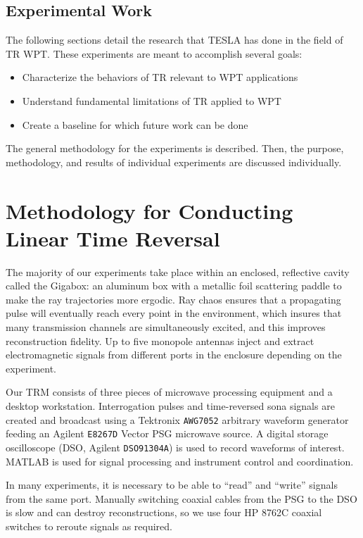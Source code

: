 \section{Experimental Work}
The following sections detail the research that TESLA has done in the field of TR WPT.  These experiments are meant to accomplish several goals:

\begin{itemize}
    \item Characterize the behaviors of TR relevant to WPT applications
    \item Understand fundamental limitations of TR applied to WPT
    \item Create a baseline for which future work can be done
\end{itemize}

The general methodology for the experiments is described. Then, the purpose, methodology, and results of individual experiments are discussed individually.

\chapter{Methodology for Conducting Linear Time Reversal}
\label{ch:linear-meth}

The majority of our experiments take place within an enclosed, reflective cavity called the Gigabox: an aluminum box with a metallic foil scattering paddle to make the ray trajectories more ergodic. Ray chaos ensures that a propagating pulse will eventually reach every point in the environment, which insures that many transmission channels are simultaneously excited, and this improves reconstruction fidelity. Up to five monopole antennas inject and extract electromagnetic signals from different ports in the enclosure depending on the experiment.

Our TRM consists of three pieces of microwave processing equipment and a desktop workstation. Interrogation pulses and time-reversed sona signals are created and broadcast using a Tektronix \texttt{AWG7052} arbitrary waveform generator feeding an Agilent \texttt{E8267D} Vector PSG microwave source. A digital storage oscilloscope (DSO, Agilent \texttt{DSO91304A}) is used to record waveforms of interest. MATLAB is used for signal processing and instrument control and coordination.

In many experiments, it is necessary to be able to “read” and “write” signals from the same port. Manually switching coaxial cables from the PSG to the DSO is slow and can destroy reconstructions, so we use four HP 8762C coaxial switches to reroute signals as required.

